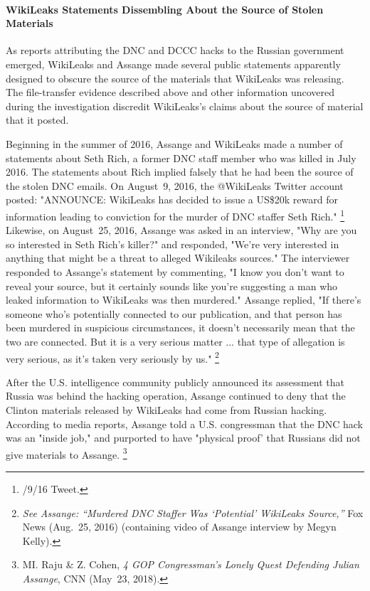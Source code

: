 \paragraph{WikiLeaks Statements Dissembling About the Source of Stolen Materials}

As reports attributing the DNC and DCCC hacks to the Russian government emerged, WikiLeaks and Assange made several public statements apparently designed to obscure the source of the materials that WikiLeaks was  releasing.
The file-transfer evidence described above and other information uncovered during the investigation discredit WikiLeaks's claims about the source of material that it posted.

Beginning in the summer of 2016, Assange and WikiLeaks made a number of statements about Seth Rich, a former DNC staff member who was killed in July 2016.
The statements about Rich implied falsely that he had been the source of the stolen DNC emails.
On August~9, 2016, the @WikiLeaks Twitter account posted: "ANNOUNCE: WikiLeaks has decided to issue a US\$20k reward for information leading to conviction for the murder of DNC staffer Seth Rich."%
\footnote{/9/16 Tweet.}
Likewise, on August~25, 2016, Assange was asked in an interview, "Why are you so interested in Seth Rich's killer?" and responded, "We're very interested in anything that might be a threat to alleged Wikileaks sources."
The interviewer responded to Assange's statement by commenting, "I know you don't want to reveal your source, but it certainly sounds like you're suggesting a man who leaked information to WikiLeaks was then murdered."
Assange replied, "If there's someone who's potentially connected to our publication, and that person has been murdered in suspicious circumstances, it doesn't necessarily mean that the two are connected.
But it is a very serious matter ... that type of allegation is very serious, as it's taken very seriously by us."%
\footnote{\textit{See Assange: “Murdered DNC Staffer Was ‘Potential' WikiLeaks Source,”} Fox News (Aug.~25, 2016) (containing video of Assange interview by Megyn Kelly).}

After the U.S. intelligence community publicly announced its assessment that Russia was behind the hacking operation, Assange continued to deny that the Clinton materials released by WikiLeaks had come from Russian hacking.
According to media reports, Assange told a U.S. congressman that the DNC hack was an "inside job," and purported to have "physical proof' that Russians did not give materials to Assange.%
\footnote{MI. Raju \& Z. Cohen, \textit{4 GOP Congressman's Lonely Quest Defending Julian Assange}, CNN (May~23, 2018).}

